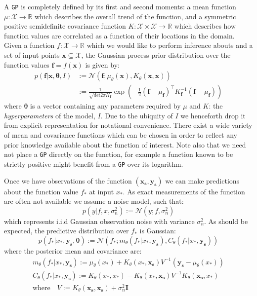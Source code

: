 \documentclass{article}
\begin{document}
A \verb"GP" is completely defined by its first and second moments: a mean function $\mu : \mathcal{X} \rightarrow \mathbb{R}$ which describes the overall trend of the function, and a symmetric positive semidefinite covariance function $K : \mathcal{X} \times \mathcal{X} \rightarrow \mathbb{R}$ which describes how function values are correlated as a function of their locations in the domain. Given a function $f : \mathcal{X} \rightarrow \mathbb{R}$ which we would like to perform inference abouts and a set of input points $\mathbf{x} \subseteq \mathcal{X}$, the Gaussian process prior distribution over the function values $\mathbf{f} = f(\mathbf{x})$ is given by:
\begin{align}
p(\mathbf{f} | \mathbf{x},\bm{\theta},I) &:= \mathcal{N}\left( \mathbf{f};\mu_\theta(\mathbf{x}),K_\theta(\mathbf{x},\mathbf{x}) \right) \\
&:= \frac{1}{\sqrt{\mathrm{det} 2 \pi K_{\mathbf{f}}} } \exp \left( - \frac{1}{2} (\mathbf{f}-\mu_{\mathbf{f}})^\top K_\mathbf{f}^{-1} (\mathbf{f}-\mu_{\mathbf{f}})  \right)
\end{align}
where $\bm{\theta}$ is a vector containing any parameters required by $\mu$ and $K$: the \emph{hyperparameters} of the model, $I$. Due to the ubiquity of $I$ we henceforth drop it from explicit representation for notational convenience. %
There exist a wide variety of mean and covariance functions which can be chosen in order to reflect any prior knowledge available about the function of interest. Note also that we need not place a \verb"GP" directly on the function, for example a function known to be strictly positive might benefit from a \verb"GP" over its logarithm.

Once we have observations of the function $(\mathbf{x_s},\mathbf{y_s})$ we can make predictions about the function value $f_*$ at input $x_*$. As exact measurements of the function are often not available we assume a noise model, such that:
\begin{equation}\label{obsnoise}
p(y | f, x, \sigma_n^2) := \mathcal{N}(y; f, \sigma_n^2)
\end{equation} 
which represents i.i.d Gaussian observation noise with variance $\sigma_n^2$. As should be expected, the predictive distribution over $f_*$ is Gaussian:
\begin{equation}\label{posteriorpred}
p(f_* | x_*, \mathbf{y_s},\bm{\theta}) := \mathcal{N} ( f_* ; m_\theta(f_* | x_*, \mathbf{y_s}), C_\theta(f_* | x_*, \mathbf{y_s}))
\end{equation}
where the posterior mean and covariance are:
\begin{align}
m_\theta(f_* | x_*, \mathbf{y_s}) := \mu_\theta(x_*) + K_\theta(x_*,\mathbf{x_s})V^{-1}(\mathbf{y_s} - \mu_\theta(x_*))\\
C_\theta(f_* | x_*, \mathbf{y_s}) := K_\theta(x_*,x_*) - K_\theta(x_*,\mathbf{x_s})V^{-1}K_\theta(\mathbf{x_s},x_*)\\
\mathrm{where}\quad V := K_\theta(\mathbf{x_s},\mathbf{x_s}) + \sigma_n^2\mathbf{I}
\end{align}
\end{document}
